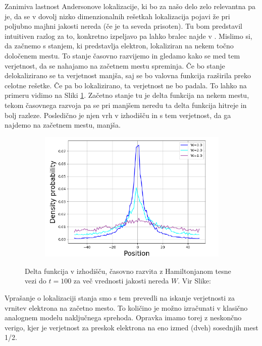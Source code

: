 Zanimiva lastnost Andersonove lokalizacije, ki bo za našo delo zelo relevantna pa je, da se v dovolj nizko dimenzionalnih rešetkah lokalizacija pojavi že pri poljubno majhni jakosti nereda (če je ta seveda prisoten). Tu bom predstavil intuitiven razlog za to, konkretno izpeljavo pa lahko bralec najde v \cite{anderson}.
Mislimo si, da začnemo s stanjem, ki predstavlja elektron, lokaliziran na nekem točno določenem mestu. To stanje časovno razvijemo in gledamo kako se med tem verjetnost, da se nahajamo na začetnem mestu spreminja. Če bo stanje delokalizirano se ta verjetnost manjša, saj se bo valovna funkcija razširila preko celotne rešetke. Če pa bo lokalizirano, ta verjetnost ne bo padala. To lahko na primeru vidimo na Sliki \ref{fig:AndersonTime}. Začetno stanje tu je delta funkcija  na nekem mestu, tekom časovnega razvoja pa se pri manjšem neredu ta delta funkcija hitreje in bolj razleze. Posledično je njen vrh v izhodišču in s tem verjetnost, da ga najdemo na začetnem mestu, manjša.
\begin{figure}[H]
\centering
\begin{subfigure}{.5\textwidth}
\includegraphics[width=\linewidth]{Figures/AndersonTime.pdf}
\end{subfigure}
\caption{Delta funkcija v izhodišču, časovno razvita z Hamiltonjanom tesne vezi do $t=100$ za več vrednosti jakosti nereda $W$. Vir Slike: \cite{anderson}}
\label{fig:AndersonTime}
\end{figure}
Vprašanje o lokalizaciji stanja smo s tem prevedli na iskanje verjetnosti za vrnitev elektrona na začetno mesto. To količino je možno izračunati v klasično analognem modelu naključnega sprehoda. 
Opravka imamo torej z neskončno verigo, kjer je verjetnost za preskok elektrona na eno izmed (dveh) sosednjih mest 1/2. 
